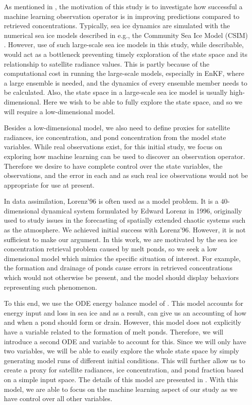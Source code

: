 As mentioned in , the motivation of this study is to investigate how successful a machine learning observation operator is in improving predictions compared to retrieved concentrations. Typically, sea ice dynamics are simulated with the numerical sea ice models described in  e.g., the Community Sea Ice Model (CSIM) \cite{CICE}. However, use of such large-scale sea ice models in this study, while describable, would act as a bottleneck preventing timely exploration of the state space and its relationship to satellite radiance values. This is partly because of the computational cost in running the large-scale models, especially in EnKF, where a large ensemble is needed, and the dynamics of every ensemble member needs to be calculated. Also, the state space in a large-scale sea ice model is usually high-dimensional. Here we wish to be able to fully explore the state space, and so we will require a low-dimensional model.

Besides a low-dimensional model, we also need to define proxies for satellite radiances, ice concentration, and pond concentration from the model state variables. While real observations exist, for this initial study, we focus on exploring how machine learning can be used to discover an observation operator. Therefore we desire to have complete control over the state variables, the observations, and the error in each and as such real ice observations would not be appropriate for use at present.

In data assimilation, Lorenz'96 \cite{Lorenz96} is often used as a model problem. It is a $40$-dimensional dynamical system formulated by Edward Lorenz in 1996, originally used to study issues in the forecasting of spatially extended chaotic systems such as the atmosphere. We achieved initial success with Lorenz'96. However, it is not sufficient to make our argument. In this work, we are motivated by the sea ice concentration retrieval problem caused by melt ponds, so we seek a low dimensional model which mimics the specific situation of interest. For example, the formation and drainage of ponds cause errors in retrieved concentrations which would not otherwise be present, and the model should display behaviors representing such phenomenon. 

To this end, we use the ODE energy balance model of \cite{EW09}. This model accounts for energy input and loss in sea ice and as a result, can give us an accounting of how and when a pond should form or drain. However, this model does not explicitly have a variable related to the formation of melt ponds. Therefore, we will introduce a second ODE and variable to account for this. Since we will only have two variables, we will be able to easily explore the whole state space by simply generating model runs of different initial conditions. This will further allow us to create a proxy for satellite radiances, ice concentration, and pond fraction based on a simple input space. The details of this model are presented in .  With this model, we are able to focus on the machine learning aspect of our study as we have control over all other variables. 

